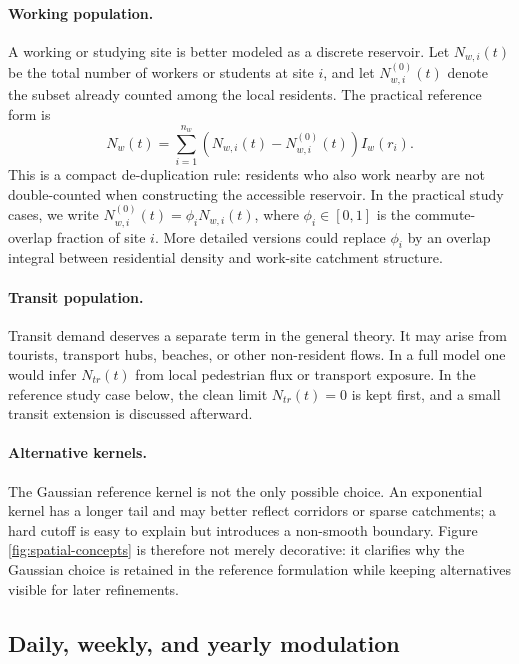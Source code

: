 \documentclass{article}
\begin{document}
\paragraph{Working population.}
A working or studying site is better modeled as a discrete reservoir. Let \( N_{w,i}(t) \) be the total number of workers or students at site \( i \), and let \( N^{(0)}_{w,i}(t) \) denote the subset already counted among the local residents. The practical reference form is
\begin{equation}
\label{eq:Nworking}
    N_w(t) = \sum_{i=1}^{n_w} \left(N_{w,i}(t) - N^{(0)}_{w,i}(t)\right) I_w(r_i).
\end{equation}
This is a compact de-duplication rule: residents who also work nearby are not double-counted when constructing the accessible reservoir. In the practical study cases, we write \( N^{(0)}_{w,i}(t) = \phi_i N_{w,i}(t) \), where \( \phi_i \in [0,1] \) is the commute-overlap fraction of site \( i \). More detailed versions could replace \( \phi_i \) by an overlap integral between residential density and work-site catchment structure.

\paragraph{Transit population.}
Transit demand deserves a separate term in the general theory. It may arise from tourists, transport hubs, beaches, or other non-resident flows. In a full model one would infer \( N_{tr}(t) \) from local pedestrian flux or transport exposure. In the reference study case below, the clean limit \( N_{tr}(t)=0 \) is kept first, and a small transit extension is discussed afterward.

\paragraph{Alternative kernels.}
The Gaussian reference kernel is not the only possible choice. An exponential kernel has a longer tail and may better reflect corridors or sparse catchments; a hard cutoff is easy to explain but introduces a non-smooth boundary. Figure \ref{fig:spatial-concepts} is therefore not merely decorative: it clarifies why the Gaussian choice is retained in the reference formulation while keeping alternatives visible for later refinements.

\subsection{Daily, weekly, and yearly modulation}
\label{sec:temporal}
\end{document}
